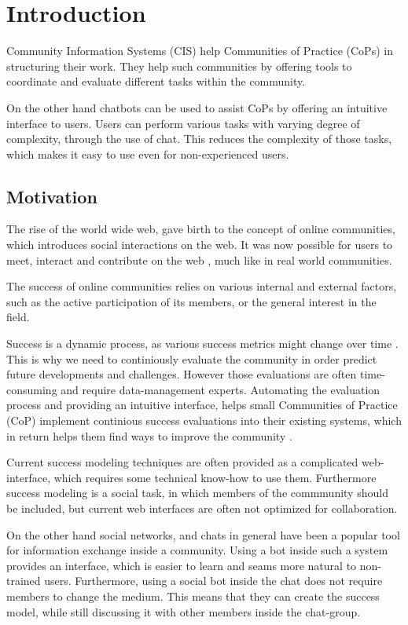 \chapter{Introduction}
Community Information Systems (CIS) help Communities of Practice (CoPs) in structuring their work. They help such communities by offering tools to coordinate and evaluate different tasks within the community.

On the other hand chatbots can be used to assist CoPs by offering an intuitive interface to users. Users can perform various tasks with varying degree of complexity, through the use of chat. This reduces the complexity of those tasks, which makes it easy to use even for non-experienced users.

\section{Motivation}
The rise of the world wide web, gave birth to the concept of online communities, which introduces social interactions on the web. It was now possible for users to meet, interact and contribute on the web \cite{Renz08}, much like in real world communities.

The success of online communities relies on various internal and external factors, such as the active participation of its members, or the general interest in the field.

Success is a dynamic process, as various success metrics might change over time \cite{Renz08}. This is why we need to continiously evaluate the community in order predict future developments and challenges. However those evaluations are often time-consuming and require data-management experts. Automating the evaluation process and providing an intuitive interface, helps small Communities of Practice (CoP) implement continious success evaluations into their existing systems, which in return helps them find ways to improve the community \cite{Renz08}.

Current success modeling techniques are often provided as a complicated web-interface, which requires some technical know-how to use them. Furthermore success modeling is a social task, in which members of the commmunity should be included, but current web interfaces are often not optimized for collaboration.

On the other hand social networks, and chats in general have been a popular tool for information exchange inside a community. Using a bot inside such a system provides an interface, which is easier to learn and seams more natural to non-trained users. Furthermore, using a social bot inside the chat does not require members to change the medium. This means that they can create the success model, while still discussing it with other members inside the chat-group.

